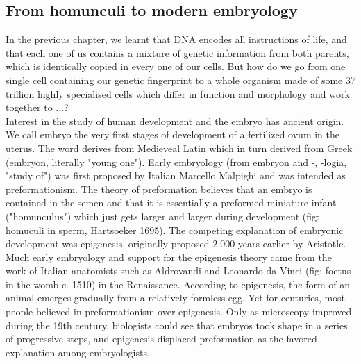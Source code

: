 \subsection{From homunculi to modern embryology}

In the previous chapter, we learnt that DNA encodes all instructions of life, and that each one of us contains a mixture of genetic information from both parents, which is identically copied in every one of our cells.
But how do we go from one single cell containing our genetic fingerprint to a whole organism made of some 37 trillion highly specialised cells which differ in function and morphology and work together to ...?\\

Interest in the study of human development and the embryo has ancient origin.
We call embryo the very first stages of development of a fertilized ovum in the uterus.
The word derives from Medieveal Latin which in turn derived from Greek \textepsilon\textmu\textbeta\textrho\textupsilon\textomikron\textnu  (embryon, literally "young one").
Early embryology (from embryon and -\textlambda\textomikron\textgamma\textiota\textalpha, -logia, "study of") was first proposed by Italian Marcello Malpighi and was intended as preformationism.
The theory of preformation believes that an embryo is contained in the semen and that it is essentially a preformed miniature infant ("homunculus") which just gets larger and larger during development (fig: homuculi in sperm, Hartsoeker 1695).
The competing explanation of embryonic development was epigenesis, originally proposed 2,000 years earlier by Aristotle. 
Much early embryology and support for the epigenesis theory came from the work of Italian anatomists such as Aldrovandi and Leonardo da Vinci (fig: foetus in the womb c. 1510) in the Renaissance.
According to epigenesis, the form of an animal emerges gradually from a relatively formless egg. 
Yet for centuries, most people believed in preformationism over epigenesis.
Only as microscopy improved during the 19th century, biologists could see that embryos took shape in a series of progressive steps, and epigenesis displaced preformation as the favored explanation among embryologists.\\

